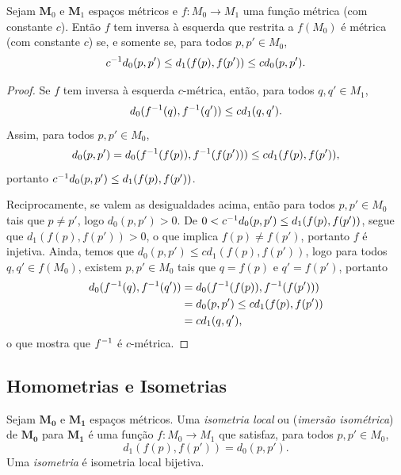 \begin{prop}
Sejam $\bm M_0$ e $\bm M_1$ espaços métricos e $f\colon M_0 \to M_1$ uma função métrica (com constante $c$). Então $f$ tem inversa à esquerda que restrita a $f(M_0)$ é métrica (com constante $c$) se, e somente se, para todos $p,p' \in M_0$,
	\begin{equation*}
	c^{-1} d_0(p,p') \leq d_1(f(p),f(p')) \leq cd_0(p,p').
	\end{equation*}
\end{prop}
\begin{proof}
Se $f$ tem inversa à esquerda $c$-métrica, então, para todos $q,q' \in M_1$,
	\begin{equation*}
	d_0(f^{-1}(q),f^{-1}(q')) \leq c d_1(q,q').
	\end{equation*}
Assim, para todos $p,p' \in M_0$,
	\begin{equation*}
	d_0(p,p') = d_0(f^{-1}(f(p)),f^{-1}(f(p'))) \leq c d_1(f(p),f(p')),
	\end{equation*}
portanto $c^{-1} d_0(p,p') \leq d_1(f(p),f(p'))$.

Reciprocamente, se valem as desigualdades acima, então para todos $p,p' \in M_0$ tais que $p \neq p'$, logo $d_0(p,p') > 0$. De $0 < c^{-1} d_0(p,p') \leq d_1(f(p),f(p'))$, segue que $d_1(f(p),f(p'))>0$, o que implica $f(p) \neq f(p')$, portanto $f$ é injetiva. Ainda, temos que $d_0(p,p') \leq c d_1(f(p),f(p'))$, logo para todos $q,q' \in f(M_0)$, existem $p,p' \in M_0$ tais que $q=f(p)$ e $q'=f(p')$, portanto
	\begin{align*}
	d_0(f^{-1}(q),f^{-1}(q')) &= d_0(f^{-1}(f(p)),f^{-1}(f(p'))) \\
		&= d_0(p,p') \leq c d_1(f(p),f(p')) \\
		&= c d_1(q,q'),
	\end{align*}
o que mostra que $f^{-1}$ é $c$-métrica.


\end{proof}

\subsection{Homometrias e Isometrias}

\begin{defi}
Sejam $\bm{M_0}$ e $\bm{M_1}$ espaços métricos. Uma \emph{isometria local} ou (\emph{imersão isométrica}) de $\bm{M_0}$ para $\bm{M_1}$ é uma função $f\colon M_0 \to M_1$ que satisfaz, para todos $p,p' \in M_0$,
	\begin{equation*}
	d_1(f(p),f(p')) = d_0(p,p').
	\end{equation*}
Uma \emph{isometria} é isometria local bijetiva.
\end{defi}

